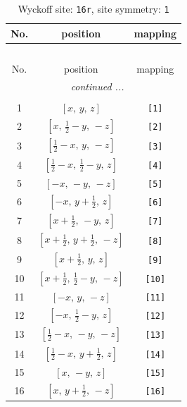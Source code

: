 \documentclass[fleqn,8pt]{jsarticle}
\begin{document}
\begin{longtable}{ccc}
\caption{Wyckoff site: {\tt 16r}, site symmetry: {\tt 1}}
 \\
 \hline \hline
No. & position & mapping \\ \hline \endfirsthead

\multicolumn{2}{l}{\tablename\ \thetable{}} \\
 \hline \hline
No. & position & mapping \\ \hline \endhead

 \hline \hline
\multicolumn{2}{r}{\footnotesize\it continued ...} \\ \endfoot

 \hline \hline
\multicolumn{2}{r}{} \\ \endlastfoot

1 & $\left[ x,\, y,\, z \right]$ & {\tt [1]} \\ \hline
2 & $\left[ x,\, \frac{1}{2} - y,\, - z \right]$ & {\tt [2]} \\ \hline
3 & $\left[ \frac{1}{2} - x,\, y,\, - z \right]$ & {\tt [3]} \\ \hline
4 & $\left[ \frac{1}{2} - x,\, \frac{1}{2} - y,\, z \right]$ & {\tt [4]} \\ \hline
5 & $\left[ - x,\, - y,\, - z \right]$ & {\tt [5]} \\ \hline
6 & $\left[ - x,\, y + \frac{1}{2},\, z \right]$ & {\tt [6]} \\ \hline
7 & $\left[ x + \frac{1}{2},\, - y,\, z \right]$ & {\tt [7]} \\ \hline
8 & $\left[ x + \frac{1}{2},\, y + \frac{1}{2},\, - z \right]$ & {\tt [8]} \\ \hline
9 & $\left[ x + \frac{1}{2},\, y,\, z \right]$ & {\tt [9]} \\ \hline
10 & $\left[ x + \frac{1}{2},\, \frac{1}{2} - y,\, - z \right]$ & {\tt [10]} \\ \hline
11 & $\left[ - x,\, y,\, - z \right]$ & {\tt [11]} \\ \hline
12 & $\left[ - x,\, \frac{1}{2} - y,\, z \right]$ & {\tt [12]} \\ \hline
13 & $\left[ \frac{1}{2} - x,\, - y,\, - z \right]$ & {\tt [13]} \\ \hline
14 & $\left[ \frac{1}{2} - x,\, y + \frac{1}{2},\, z \right]$ & {\tt [14]} \\ \hline
15 & $\left[ x,\, - y,\, z \right]$ & {\tt [15]} \\ \hline
16 & $\left[ x,\, y + \frac{1}{2},\, - z \right]$ & {\tt [16]} \\
\end{longtable}
\end{document}
